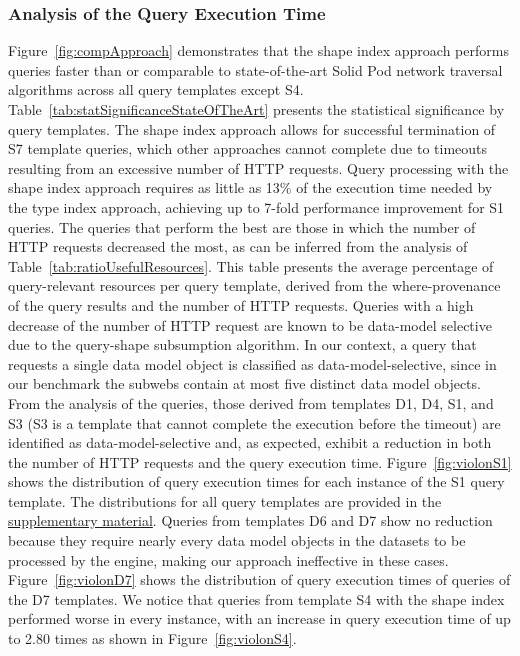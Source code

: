 \subsubsection{Analysis of the Query Execution Time}
Figure~\ref{fig:compApproach} demonstrates that the shape index approach performs queries faster than or comparable to state-of-the-art Solid Pod network traversal algorithms across all query templates except S4.
Table~\ref{tab:statSignificanceStateOfTheArt} presents the statistical significance by query templates.
The shape index approach allows for successful termination of S7 template queries, which other approaches cannot complete due to timeouts resulting from an excessive number of HTTP requests.
Query processing with the shape index approach requires as little as 13\% of the execution time needed by the type index approach, achieving up to 7-fold performance improvement for S1 queries.
The queries that perform the best are those in which the number of HTTP requests decreased the most, as can be inferred from the analysis of Table~\ref{tab:ratioUsefulResources}.
This table presents the average percentage of query-relevant resources per query template, derived from the where-provenance~\cite{buneman2001and} of the query results and the number of HTTP requests. 
Queries with a high decrease of the number of HTTP request are known to be data-model selective due to the query-shape subsumption algorithm.
In our context, a query that requests a single data model object is classified as data-model-selective, since in our benchmark the subwebs contain at most five distinct data model objects.
From the analysis of the queries, those derived from templates D1, D4, S1, and S3 (S3 is a template that cannot complete the execution before the timeout) are identified as data-model-selective and, as expected, exhibit a reduction in both the number of HTTP requests and the query execution time.
Figure~\ref{fig:violonS1} shows the distribution of query execution times for each instance of the S1 query template.
The distributions for all query templates are provided in the \hyperref[sec:supplementalMaterial]{supplementary material}.
Queries from templates D6 and D7 show no reduction because they require nearly every data model objects in the datasets to be processed by the engine, making our approach ineffective in these cases.
Figure~\ref{fig:violonD7} shows the distribution of query execution times of queries of the D7 templates.
We notice that queries from template S4 with the shape index performed worse in every instance, with an increase in query execution time of up to 2.80 times as shown in Figure~\ref{fig:violonS4}.
